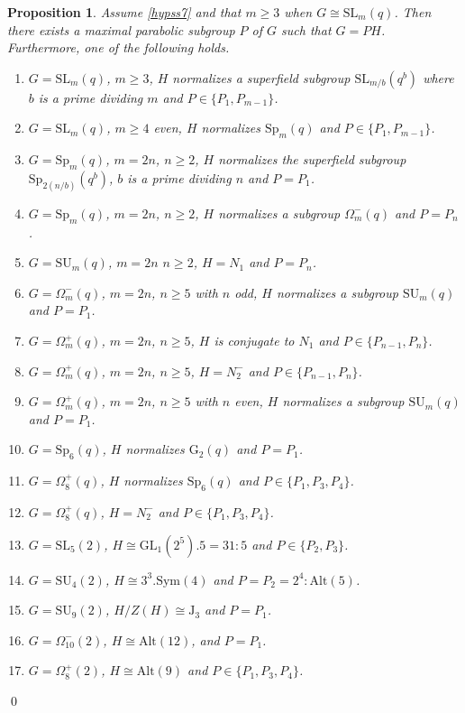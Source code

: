 \documentclass[12pt]{amsart}
\newtheorem{proposition}[theorem]{Proposition}
\theoremstyle{remark}
\theoremstyle{notation}
\theoremstyle{definition}
\newcommand{\SU}{\mathrm{SU}}
\newcommand{\G}{\mathrm{G}}
\newcommand{\GL}{\mathrm{GL}}
\newcommand{\Sp}{\mathrm{Sp}}
\newcommand{\SL}{\mathrm{SL}}
\newcommand{\0}{\emptyset}
\newcommand{\Sym}{\mathrm{Sym}}
\newcommand{\Alt}{\mathrm{Alt}}
\begin{document}
\begin{proposition}\label{prop:char2 list}
Assume \cref{hypss7} and that $m \ge 3$ when $G \cong \SL_m(q)$. Then there exists a maximal parabolic subgroup $P$ of $G$ such that $G=PH$. Furthermore, one of the following holds.
\begin{enumerate}
\item  $G=\SL_m(q)$, $m \ge 3$, $H$ normalizes a superfield subgroup $\SL_{m/b}(q^{b})$ where $b$ is a prime dividing $m$ and $P\in \{P_1,P_{m-1}\}$.
\item $G= \SL_m(q)$, $m\ge 4$ even, $H$ normalizes $\Sp_{m}(q)$ and $P\in \{P_1,P_{m-1}\}$.
\item $G= \Sp_{m}(q)$, $m=2n$, $n \ge 2$,  $H$ normalizes the superfield subgroup $\Sp_{2(n/b)}(q^{b})$, $b$ is a prime  dividing $n$ and $P=P_1$.
\item $G= \Sp_{m}(q)$, $m=2n$, $n \ge 2$, $H$ normalizes a subgroup $\Omega_{m}^-(q)$ and $P= P_n$.
\item $G=\SU_{m}(q)$, $m=2n$ $n \ge 2$, $H=N_1$ and  $P= P_{n}$.
\item $G=\Omega_{m}^-(q)$, $m=2n$,  $n\ge 5$ with $n$ odd, $H$ normalizes a subgroup $ \SU_m(q)$ and $P=P_1$.
\item $G=\Omega_{m}^+(q)$, $m=2n$, $n \ge 5$,  $H$ is conjugate to $ N_1$  and $P\in\{P_{n-1},P_n\}$.
\item $G=\Omega_{m}^+(q)$, $m=2n$, $n \ge 5$,  $H=N_{2}^-$ and $P\in\{P_{n-1},P_n\}$.
\item $G=\Omega_{m}^+(q)$, $m=2n$, $n \ge 5$ with $n$ even, $H$ normalizes a subgroup $ \SU_m(q)$  and  $P=P_1$.
\item $G=\Sp_6(q)$, $H$ normalizes $\G_2(q)$ and $P=P_1$.
\item $G=\Omega_8^+(q)$, $H $ normalizes $\Sp_6(q)$ and $P\in \{P_1,P_3,P_4\}$.
    \item $G=\Omega_8^+(q)$, $H=N_2^-$ and $P\in \{P_1,P_3,P_4\}$.
\item $G=\SL_5(2)$, $H\cong  \GL_1(2^5).5=31{:}5$ and $P\in \{P_2,P_3\}$.
\item $G=\SU_4(2)$, $H\cong  3^3.\Sym(4)$ and  $P=P_2=2^{ 4}{:}\Alt(5)$.
\item $G= \SU_9(2)$, $H/Z(H) \cong \mathrm J_3$ and $P=P_1$.
\item $G=\Omega_{10}^-(2)$, $H\cong \Alt(12)$, and $P=P_1$.
  \item   $G=\Omega_8^+(2)$, $H \cong \Alt(9)$ and $P\in \{P_1,P_3,P_4\}$.
\end{enumerate}
\end{proposition}\qed
\end{document}
